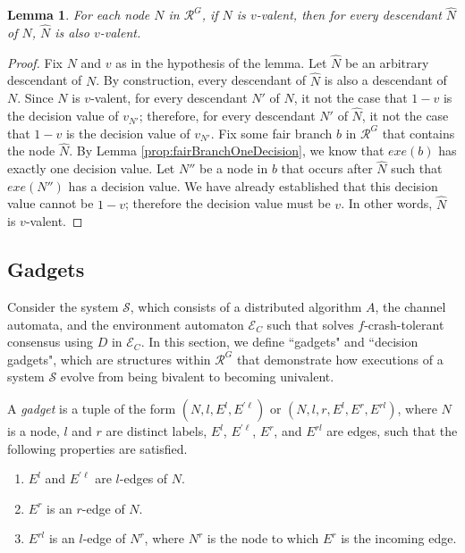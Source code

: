 \documentclass[11pt]{article}
\numberwithin{theorem}{section}
\newtheorem{lemma}[theorem]{Lemma}
\begin{document}
\begin{lemma}\label{lem:univalentDescendentIsUnivalent}
For each node $N$ in $\mathcal{R}^{G}$, if $N$ is $v$-valent, then for
every descendant $\hat{N}$ of $N$, $\hat{N}$ is also $v$-valent.
\end{lemma}
\begin{proof}
Fix $N$ and $v$ as in the hypothesis of the lemma. Let $\hat{N}$ be an arbitrary descendant of $N$. By construction, every descendant of $\hat{N}$ is also a descendant of $N$. Since $N$ is $v$-valent, for every descendant $N'$ of $N$, it not the case that $1-v$ is the decision value of $v_{N'}$; therefore, for every descendant $N'$ of $\hat{N}$, it not the case that $1-v$ is the decision value of $v_{N'}$. Fix some fair branch $b$ in $\mathcal{R}^G$ that contains the node $\hat{N}$. By Lemma \ref{prop:fairBranchOneDecision}, we know that $exe(b)$ has exactly one decision value. Let $N''$ be a node in $b$ that occurs after $\hat{N}$ such that $exe(N'')$ has a decision value. We have already established that this decision value cannot be $1-v$; therefore the decision value must be $v$. In other words, $\hat{N}$ is $v$-valent.
\end{proof}

\subsection{Gadgets}
Consider the system $\mathcal{S}$, which
consists of a distributed algorithm $A$, the channel automata, and the environment automaton $\mathcal{E}_C$ such that solves $f$-crash-tolerant
consensus using $D$ in $\mathcal{E}_C$. In this section, we define ``gadgets" and ``decision gadgets", which are structures within $\mathcal{R}^G$ that demonstrate how executions
of a system $\mathcal{S}$ evolve from being bivalent to becoming
univalent.



A \emph{gadget} is a tuple of the form $(N,l,E^l,E^{\prime \ell})$ or $(N,l,r,E^l,E^r,E^{rl})$, where $N$ is a node, $l$ and $r$ are distinct labels, $E^l$, $E^{\prime \ell}$, $E^r$, and $E^{rl}$ are edges, such that the following properties are satisfied.
\begin{enumerate}
\item $E^l$ and $E^{\prime \ell}$ are $l$-edges of $N$.
 \item $E^r$ is an $r$-edge of $N$.
 \item $E^{rl}$ is an $l$-edge of $N^r$, where $N^r$ is the node to which $E^r$ is the incoming edge.
\end{enumerate}
\end{document}

